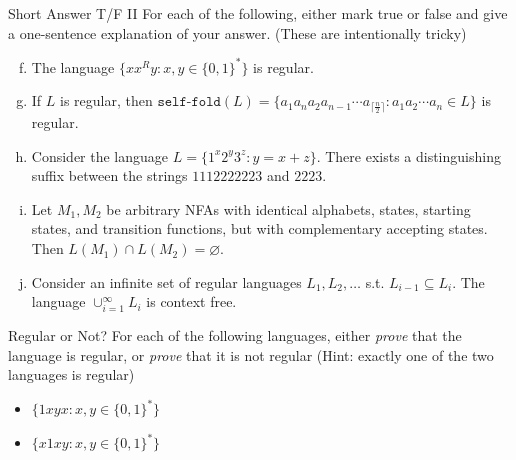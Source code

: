 \documentclass{beamer}
\begin{document}
\begin{frame}[t]{Short Answer T/F II}
    For each of the following, either mark true or false and give a one-sentence explanation of your answer. (These are intentionally tricky)
     \vspace{.5cm}
    \begin{enumerate}[(a)]
        \setcounter{enumi}{5}
        \item The language $\{xx^Ry: x,y \in \{0,1\}^*\}$ is regular.
        \vspace{1cm}
        \item If $L$ is regular, then $\texttt{self-fold}(L) = \{ a_1a_na_2a_{n-1}\dotsb a_{\lceil\frac{n}{2}\rceil} : a_1a_2\dotsb a_n\in L\}$ is regular.
        \vspace{1cm}
        \item Consider the language $L = \{1^x 2^y 3^z:  y = x + z\}$. There exists a distinguishing suffix between the strings $1112222223$ and $2223$.
        \vspace{1cm}
        \item Let $M_1, M_2$ be arbitrary NFAs with identical alphabets, states, starting states, and transition functions, but with complementary accepting states. Then $L(M_1) \cap L(M_2) = \varnothing$.
        \vspace{1cm}
        \item Consider an infinite set of regular languages $L_1, L_2, \dotsc$ s.t. $L_{i-1} \subseteq L_i$. The language $\cup_{i=1}^\infty L_i$ is context free.
    \end{enumerate}
\end{frame}

\begin{frame}[t]{Regular or Not?}
    For each of the following languages, either \textit{prove} that the language is regular, or \textit{prove} that it is not regular (\alert{Hint:} exactly one of the two languages is regular)
    \begin{itemize}
        \item $\{1xyx: x, y \in \{0, 1\}^*\}$
        \item $\{x1xy: x, y \in \{0, 1\}^*\}$
    \end{itemize}

    
\end{frame}
\end{document}
